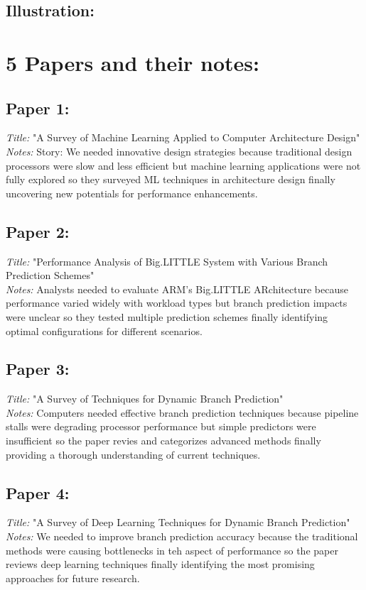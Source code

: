 \documentclass{article}
\begin{document}
\subsection{Illustration: }




\section{5 Papers and their notes:}

\subsection{Paper 1:}
\emph{Title: }"A Survey of Machine Learning Applied to Computer Architecture Design"\cite{penneySurveyMachineLearning2019}\\
\emph{Notes: }
Story: We needed innovative design strategies
because traditional design processors were slow and less efficient
but machine learning applications were not fully explored
so they surveyed ML techniques in architecture design
finally uncovering new potentials for performance enhancements.

\subsection{Paper 2:}
\emph{Title: }"Performance Analysis of Big.LITTLE System with Various Branch Prediction Schemes"\cite{rodriguesPerformanceAnalysisBigLITTLE2021}\\
\emph{Notes: }
Analysts needed to evaluate ARM's Big.LITTLE ARchitecture
because performance varied widely with workload types 
but branch prediction impacts were unclear 
so they tested multiple prediction schemes 
finally identifying optimal configurations for different scenarios.

\subsection{Paper 3:}
\emph{Title: }"A Survey of Techniques for Dynamic Branch Prediction"\cite{mittalSurveyTechniquesDynamic2019a}\\
\emph{Notes: }
Computers needed effective branch prediction techniques 
because pipeline stalls were degrading processor performance 
but simple predictors were insufficient 
so the paper revies and categorizes advanced methods 
finally providing a thorough understanding of current techniques.

\subsection{Paper 4:}
\emph{Title: }"A Survey of Deep Learning Techniques for Dynamic Branch Prediction"\cite{josephSurveyDeepLearning2021}\\
\emph{Notes: }
We needed to improve branch prediction accuracy
because the traditional methods were causing bottlenecks in teh aspect of performance
so the paper reviews deep learning techniques 
finally identifying the most promising approaches for future research.
\end{document}
